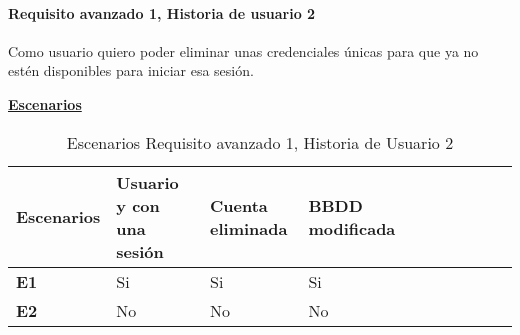 \documentclass[../ei103948-project-documentation.tex]{subfiles}
\begin{document}
				\paragraph{Requisito avanzado 1, Historia de usuario 2}
					Como usuario quiero poder eliminar unas credenciales únicas para que ya no estén disponibles para iniciar esa sesión.
	
					\begin{center}
						\textbf{\underline{Escenarios}}
						\begin{table}[H]
							\centering
							\begin{tabular}{|p{0.14\linewidth}|p{0.20\linewidth}|p{0.20\linewidth}|p{0.20\linewidth}|p{0.12\linewidth}|p{0.12\linewidth}|p{0.12\linewidth}|}
								\hline
								\textbf{Escenarios} & \textbf{Usuario y con una sesión} & \textbf{Cuenta eliminada} & \textbf{BBDD modificada} \\ \hline
								\textbf{E1}         & Si                                                   & Si                        & Si                       \\ \hline
								\textbf{E2}         & No                                                   & No                        & No                       \\ \hline
								\end{tabular}
							\caption{Escenarios Requisito avanzado 1, Historia de Usuario 2}
						\end{table}

						\descripcionAvanzadaB

						\newpage
	

\end{center}
\end{document}
